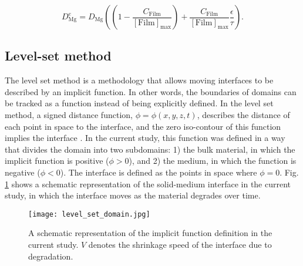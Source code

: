 \begin{equation} \label{eq:diff_coeff_parallel}
D_{\mathrm{Mg}}^{e}=D_{\mathrm{Mg}}\left(\left(1-\frac{C_{\mathrm{Film}}}{[\mathrm{Film}]_{\max }}\right)+\frac{C_{\mathrm{Film}}}{[\mathrm{Film}]_{\max }} \frac{\epsilon}{\tau}\right).
\end{equation}

\subsection{Level-set method}

The level set method is a methodology that allows moving interfaces to be described by an implicit function. In other words, the boundaries of domains can be tracked as a function instead of being explicitly defined. In the level set method, a signed distance function, $\phi = \phi(x,y,z,t)$, describes the distance of each point in space to the interface, and the zero iso-contour of this function implies the interface \cite{RonaldFedkiw2002}. In the current study, this function was defined in a way that divides the domain into two subdomains: 1) the bulk material, in which the implicit function is positive ($\phi > 0$), and 2) the medium, in which the function is negative ($\phi < 0$). The interface is defined as the points in space where $\phi = 0$. Fig. \ref{fig:level_set_domain} shows a schematic representation of the solid-medium interface in the current study, in which the interface moves as the material degrades over time.

\begin{figure}[h]
\centering
\medskip
\texttt{[image: level\_set\_domain.jpg]}
\caption[The implicit function definition in the studied problem]{A schematic representation of the implicit function definition in the current study. $V$ denotes the shrinkage speed of the interface due to degradation.} \label{fig:level_set_domain}
\end{figure}

